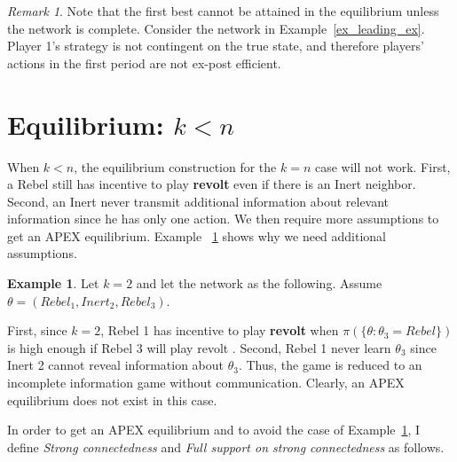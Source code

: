 \documentclass[12pt,letter]{article}
\theoremstyle{definition}
\newtheorem{example}{Example}[section]
\theoremstyle{remark}
\newtheorem*{remark}{Remark}
\theoremstyle{claim}
\begin{document}
\begin{remark}
Note that the first best cannot be attained in the equilibrium unless the network is complete. Consider the network in Example~\ref{ex_leading_ex}. Player 1's strategy is not contingent on the true state, and therefore players' actions in the first period are not ex-post efficient.   
\end{remark}



\section{Equilibrium: $k<n$}
\label{sec:equilibrium_2}


When $k<n$, the equilibrium construction for the $k=n$ case will not work. First, a Rebel still has incentive to play \textbf{revolt} even if there is an Inert neighbor. Second, an Inert never transmit additional information about relevant information since he has only one action. We then require more assumptions to get an APEX equilibrium. Example ~\ref{ex_strong_connectedness} shows why we need additional assumptions.

\begin{example}\label{ex_strong_connectedness}
Let $k=2$ and let the network as the following. Assume $\theta=(Rebel_1,Inert_2,Rebel_3)$.

\begin{center}
\end{center}

First, since $k=2$, Rebel 1 has incentive to play \textbf{revolt} when $\pi(\{\theta:\theta_3=Rebel\})$ is high enough if Rebel 3 will play revolt . Second, Rebel 1 never learn $\theta_3$ since Inert 2 cannot reveal information about $\theta_3$. Thus, the game is reduced to an incomplete information game without communication. Clearly, an APEX equilibrium does not exist in this case.

\end{example}

In order to get an APEX equilibrium and to avoid the case of Example~\ref{ex_strong_connectedness}, I define \textit{Strong connectedness} and \textit{Full support on strong connectedness} as follows.
\end{document}
